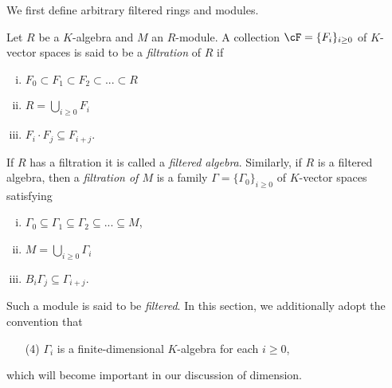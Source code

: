We first define arbitrary filtered rings and modules.

\begin{defn}\label{defn:filtered-ring}
	Let $R$ be a $K$-algebra and $M$ an $R$-module. A collection $\cF = \{F_i\}_{i \geq 0}$ of $K$-vector spaces is said to be a \emph{filtration} of $R$ if
	\begin{enumerate}[(i)]
		\item $F_0\subset F_1 \subset F_2 \subset ... \subset R$
		\item $R = \bigcup_{i\geq 0} F_i$
		\item $F_i\cdot F_j \subseteq F_{i+j}$.
	\end{enumerate}
	If $R$ has a filtration it is called a \emph{filtered algebra}. Similarly, if $R$ is a filtered algebra, then a \emph{filtration of $M$} is a family $\Gamma = \{\Gamma_0\}_{i\geq 0}$ of $K$-vector spaces satisfying
	\begin{enumerate}[(i)]
		\item $\Gamma_0 \subseteq \Gamma_1 \subseteq \Gamma_2 \subseteq ... \subseteq M$,
		\item $M = \bigcup_{i\geq 0} \Gamma_i$
		\item $B_i\Gamma_j \subseteq \Gamma_{i+j}$.
	\end{enumerate}
\end{defn}
	Such a module is said to be \emph{filtered}. In this section, we additionally adopt the convention that
	\begin{enumerate}
		\item[(4)] $\Gamma_i$ is a finite-dimensional $K$-algebra for each $i \geq 0$,
	\end{enumerate}
	which will become important in our discussion of dimension.

\newpage
\printbibliography

